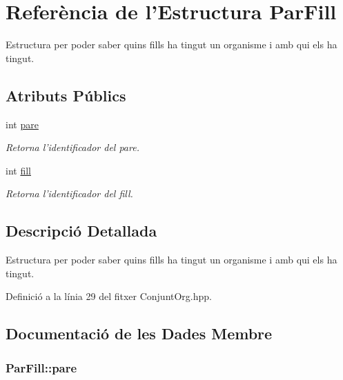 \hypertarget{struct_par_fill}{\section{Referència de l'Estructura Par\-Fill}
\label{struct_par_fill}
}


Estructura per poder saber quins fills ha tingut un organisme i amb qui els ha tingut.  


\subsection*{Atributs Públics}
\begin{DoxyCompactItemize}
\item 
int \hyperlink{struct_par_fill_a6bf4c0e229d9894e9f1988d017e20f2c}{pare}
\begin{DoxyCompactList}\small\item\em Retorna l'identificador del pare. \end{DoxyCompactList}\item 
int \hyperlink{struct_par_fill_af35c09c217a6bc97860535cc395ebc94}{fill}
\begin{DoxyCompactList}\small\item\em Retorna l'identificador del fill. \end{DoxyCompactList}\end{DoxyCompactItemize}


\subsection{Descripció Detallada}
Estructura per poder saber quins fills ha tingut un organisme i amb qui els ha tingut. 

Definició a la línia 29 del fitxer Conjunt\-Org.\-hpp.



\subsection{Documentació de les Dades Membre}
\hypertarget{struct_par_fill_a6bf4c0e229d9894e9f1988d017e20f2c}{
\subsubsection[{pare}]{\setlength{\rightskip}{0pt plus 5cm}Par\-Fill\-::pare}}\label{struct_par_fill_a6bf4c0e229d9894e9f1988d017e20f2c}


